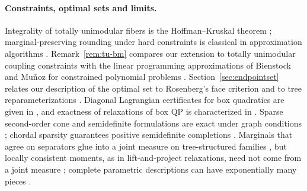 \paragraph{Constraints, optimal sets and limits.}
Integrality of totally unimodular fibers is the Hoffman--Kruskal theorem
\cite{HoffmanKruskal1956,Schrijver1986}; marginal-preserving rounding under hard
constraints is classical in approximation algorithms
\cite{GandhiEtAl2006,ChekuriVondrakZenklusen2010}. Remark~\ref{rem:tu-bm}
compares our extension to totally unimodular coupling constraints with the
linear programming approximations of Bienstock and Mu\~noz for constrained
polynomial problems \cite{BienstockMunoz2018}. Section~\ref{sec:endpointset}
relates our description of the optimal set to Rosenberg's face criterion and
to tree reparameterizations \cite{Rosenberg1972,WainwrightJaakkolaWillsky2005,Werner2007}. Diagonal Lagrangian
certificates for box quadratics are given in
\cite{BeckTeboulle2000,JeyakumarRubinovWu2006,LiWuQuan2015}, and exactness of
relaxations of box QP is characterized in \cite{QiuYildirim2024}. Sparse
second-order cone and semidefinite formulations are exact under graph
conditions \cite{SojoudiLavaei2014,DeyKhajavirad2026,Khajavirad2026SparseSDP};
chordal sparsity guarantees positive semidefinite completions
\cite{GroneEtAl1984,VandenbergheAndersen2015}. Marginals that agree on
separators glue into a joint measure on tree-structured families
\cite{Vorobev1962,WainwrightJordan2008}, but locally consistent moments, as in
lift-and-project relaxations, need not come from a joint measure
\cite{SheraliAdams1990,WainwrightJordan2008}; complete parametric descriptions
can have exponentially many pieces \cite{Murty1980,MairalYu2012,GartnerJaggiMaria2012}.
